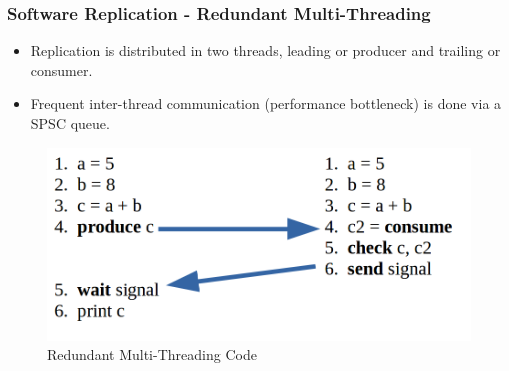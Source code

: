 \documentclass[xcolor=pdftex,dvipsnames,table]{beamer}
\begin{document}
\begin{frame}
	\frametitle{Software Replication - Redundant Multi-Threading}

	\begin{itemize}
    	\item Replication is distributed in two threads, leading or producer and trailing or consumer.
        \item Frequent inter-thread communication (performance bottleneck) is done via a SPSC queue. 
    \end{itemize}
    
    \begin{figure}[H]
    	\begin{center}
        	\captionsetup{labelformat=empty,labelsep=none}
        	\includegraphics[scale=0.25]{RMT-Code.png}
            \caption{Redundant Multi-Threading Code}
         \end{center}
     \end{figure}
    
\end{frame}
\end{document}
